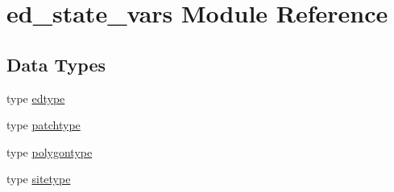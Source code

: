 \hypertarget{namespaceed__state__vars}{}\section{ed\+\_\+state\+\_\+vars Module Reference}
\label{namespaceed__state__vars}
\subsection*{Data Types}
\begin{DoxyCompactItemize}
\item 
type \hyperlink{structed__state__vars_1_1edtype}{edtype}
\item 
type \hyperlink{structed__state__vars_1_1patchtype}{patchtype}
\item 
type \hyperlink{structed__state__vars_1_1polygontype}{polygontype}
\item 
type \hyperlink{structed__state__vars_1_1sitetype}{sitetype}
\end{DoxyCompactItemize}
